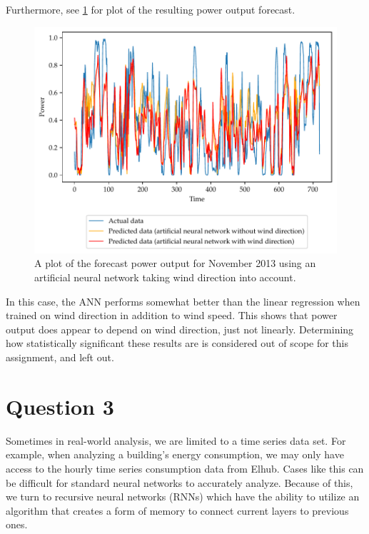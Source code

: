 \documentclass[11pt]{article}
\begin{document}
Furthermore, see \cref{fig:q2-forecast-ANN} for plot of the resulting power output forecast.

\begin{figure}[h]
  \centering
  \includegraphics{figures/q2_forecast_ANN_plot}
  \caption{A plot of the forecast power output for November 2013 using an artificial neural network taking wind direction into account.}
  \label{fig:q2-forecast-ANN}
\end{figure}

In this case, the ANN performs somewhat better than the linear regression when trained on wind direction in addition to wind speed.
This shows that power output does appear to depend on wind direction, just not linearly.
Determining how statistically significant these results are is considered out of scope for this assignment, and left out.


\clearpage
\section*{Question 3}

Sometimes in real-world analysis, we are limited to a time series data set. For example, when analyzing a building's energy consumption, we may only have access to the hourly time series consumption data from Elhub. Cases like this can be difficult for standard neural networks to accurately analyze. Because of this, we turn to recursive neural networks (RNNs) which have the ability to utilize an algorithm that creates a form of memory to connect current layers to previous ones.
\end{document}

